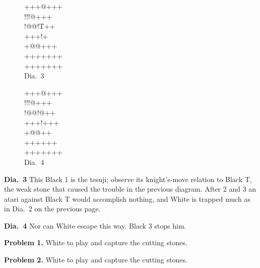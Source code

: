 \documentclass[mcrownvopaper,10pt,oneside,onecolumn,draft,showtrims]{memoir}
\begin{document}
\begin{figure}[ht]
    \begin{minipage}[c]{0.5\linewidth}
        \centering    
        {\gnos%
        +++@+++\\
        !!!@+++\\
        !@@!T++\\
        +++!{\gnosw{}}{\gnosb{}}+\\
        +@@++{\gnosb{}}+\\
        +++++++\\
        +++++++\\
        }
        Dia.\ 3
    \end{minipage}%
    \begin{minipage}[c]{0.5\linewidth}
        \centering    
        {\gnos%
        +++@+++\\
        !!!@+++\\
        !@@!@++\\
        +++!+++\\
        +@@+{\gnosw{}}{\gnosb{}}+\\
        ++++{\gnosb{}}++\\
        +++++++\\
        }
        Dia.\ 4
    \end{minipage}
\end{figure}

\noindent
\textbf{Dia.\ 3} This Black 1 is the tesuji; observe its knight's-move relation to
Black {\gnos T}, the weak stone that caused the trouble in the previous
diagram. After 2 and 3 an atari against Black {\gnos T} would accomplish
nothing, and White is trapped much as in Dia.\ 2 on the previous page. 

\noindent
\textbf{Dia.\ 4} Nor can White escape this way. Black 3 stops him.

\noindent
\textbf{Problem 1.} White to play and capture the cutting stones.

\noindent
\textbf{Problem 2.} White to play and capture the cutting stones.
\end{document}
